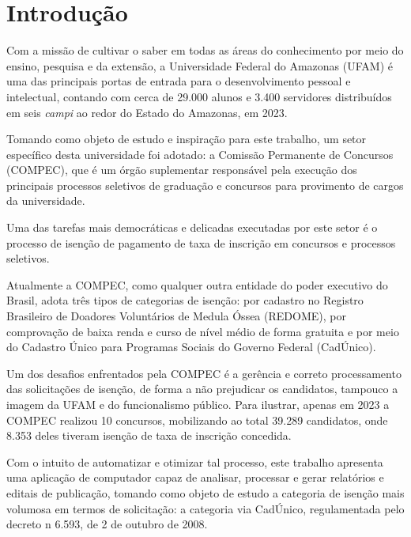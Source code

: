 \documentclass[
	12pt,			%
	openright,		%
	oneside,	
	a4paper,		%
	english,		%
	brazil			%
]{abntex2/abntex2}  %
\begin{document}
\tableofcontents*
\cleardoublepage

\textual

\chapter{Introdução}
	
	Com a missão de cultivar o saber em todas as áreas do conhecimento por meio do ensino, pesquisa e da extensão, a Universidade Federal do Amazonas (UFAM) é uma das principais
	portas de entrada para o desenvolvimento pessoal e intelectual, contando com cerca de 29.000 alunos e 3.400 servidores distribuídos em seis \textit{campi} ao redor do Estado do Amazonas, em 2023.
	
	Tomando como objeto de estudo e inspiração para este trabalho, um setor específico desta universidade foi adotado: a Comissão Permanente de Concursos (COMPEC), que é um órgão
	suplementar responsável pela execução dos principais processos seletivos de graduação e concursos para provimento de cargos da universidade.
	
	Uma das tarefas mais democráticas e delicadas executadas por este setor é o processo de isenção de pagamento de taxa de inscrição em concursos e processos seletivos.
	
	Atualmente a COMPEC, como qualquer outra entidade do poder executivo do Brasil, adota três tipos de categorias de isenção: por cadastro no Registro Brasileiro de Doadores Voluntários de Medula Óssea (REDOME), por comprovação de baixa renda e curso de nível médio de forma gratuita e por meio do Cadastro Único para Programas Sociais do Governo Federal (CadÚnico).
	
	Um dos desafios enfrentados pela COMPEC é a gerência e correto processamento das solicitações de isenção, de forma a não prejudicar os candidatos, tampouco a imagem da UFAM e do funcionalismo público. Para ilustrar, apenas em 2023 a COMPEC realizou 10 concursos, mobilizando ao total 39.289 candidatos, onde 8.353 deles tiveram isenção de taxa de inscrição concedida.
	
	Com o intuito de automatizar e otimizar tal processo, este trabalho apresenta uma aplicação de computador capaz de analisar, processar e gerar relatórios e editais de publicação, tomando como objeto de estudo a categoria de isenção mais volumosa em termos de solicitação: a categoria via CadÚnico, regulamentada pelo decreto n{\textdegree} 6.593, de 2 de outubro de 2008.
	
\end{document}
